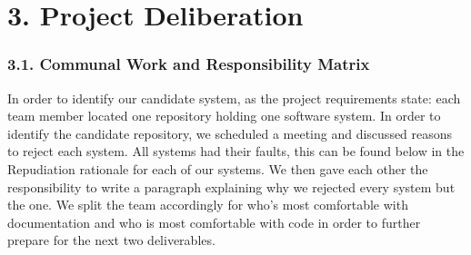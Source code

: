 \documentclass[letterpaper, 11pt]{report}
\begin{document}
\section*{3. Project Deliberation}
\subsubsection*{3.1. Communal Work and Responsibility Matrix}
\normalsize {In order to identify our candidate system, as the project requirements state: each team member located one repository holding one software system. In order to identify the candidate repository, we scheduled a meeting and discussed reasons to reject each system. All systems had their faults, this can be found below in the Repudiation rationale for each of our systems. We then gave each other the responsibility to write a paragraph explaining why we rejected every system but the one. We split the team accordingly for who’s most comfortable with documentation and who is most comfortable with code in order to further prepare for the next two deliverables.}
\end{document}
